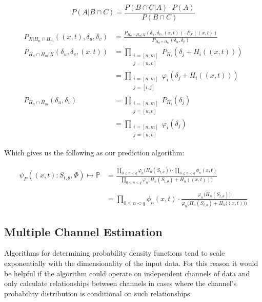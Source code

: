 \documentclass[10pt]{article}
\begin{document}
\[ P(A|B \cap C) = \frac{ P(B \cap C|A) \cdot P(A) }{ P(B \cap C) } \]

\begin{align}
P_{X|H_n \cap H_m} \left( (x,t), \delta_u, \delta_v \right) &=
	\frac { P_{H_n \cap H_m | X} \left( \delta_u, \delta_v, (x,t) \right) \cdot P_X \left( (x,t) \right) } { P_{H_n \cap H_m} \left( \delta_u, \delta_v \right) } \nonumber \\
P_{H_n \cap H_m | X} \left( \delta_u, \delta_v, (x,t) \right) &= 
	\prod_{\substack{i=[n,m] \\ j=[u,v]}} P_{H_i} \left( \delta_j + H_i((x,t)) \right) \nonumber 
\\
&= \prod_{\substack{i=[n,m]\\j=[i,j]}} \varphi_i \left( \delta_j + H_i((x,t)) \right) \\
P_{H_n \cap H_m} \left( \delta_u, \delta_v \right) &= 
	\prod_{\substack{i=[n,m]\\j=[u,v]}} P_{H_i} \left( \delta_j \right) \nonumber 
\\
&= \prod_{\substack{i=[n,m]\\j=[u,v]}} \varphi_i( \delta_j )
\end{align}

Which gives us the following as our prediction algorithm:

\begin{align}
\psi_P \left( (x,t) :S_{t,\theta}, \Phi \right) \mapsto \mathbb{P} 
	&= \frac{ \prod_{0 \le n < q} \varphi_n \big( H_n(S_{t,\theta}) \big) \cdot \prod_{0 \le n < q} \phi_n(x,t) }{ \prod_{0 \le n < q} \varphi_n \big( H_n(S_{t,\theta}) + H_n((x,t)) \big) }  \nonumber \\
\nonumber \\
&= \prod_{0 \le n < q} \phi_n(x,t) \cdot \frac{ \varphi_n \Big( H_n(S_{t,\theta}) \Big) }{ \varphi_n \Big( H_n(S_{t,\theta}) + H_n\big((x,t)\big) \Big) }
\end{align}


\subsection{Multiple Channel Estimation}
Algorithms for determining probability density functions tend to scale exponentially with the dimensionality of the input data.  For this reason it would be helpful if the algorithm could operate on independent channels of data and only calculate relationships between channels in cases where the channel's probability distribution is conditional on such relationships.
\end{document}

